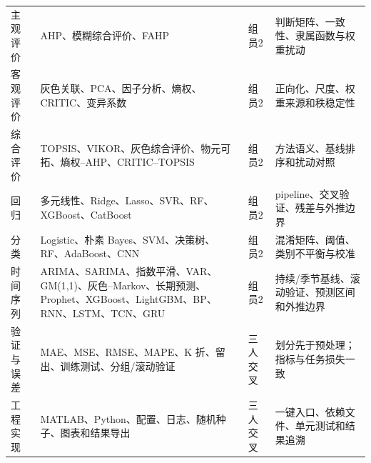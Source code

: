 \begin{longtable}{p{2.1cm}p{5.0cm}p{2.0cm}p{5.5cm}}
主观评价 & AHP、模糊综合评价、FAHP & 组员2 & 判断矩阵、一致性、隶属函数与权重扰动\\
客观评价 & 灰色关联、PCA、因子分析、熵权、CRITIC、变异系数 & 组员2 & 正向化、尺度、权重来源和秩稳定性\\
综合评价 & TOPSIS、VIKOR、灰色综合评价、物元可拓、熵权--AHP、CRITIC--TOPSIS & 组员2 & 方法语义、基线排序和扰动对照\\
回归 & 多元线性、Ridge、Lasso、SVR、RF、XGBoost、CatBoost & 组员2 & pipeline、交叉验证、残差与外推边界\\
分类 & Logistic、朴素 Bayes、SVM、决策树、RF、AdaBoost、CNN & 组员2 & 混淆矩阵、阈值、类别不平衡与校准\\
时间序列 & ARIMA、SARIMA、指数平滑、VAR、GM(1,1)、灰色--Markov、长期预测、Prophet、XGBoost、LightGBM、BP、RNN、LSTM、TCN、GRU & 组员2 & 持续/季节基线、滚动验证、预测区间和外推边界\\
验证与误差 & MAE、MSE、RMSE、MAPE、K 折、留出、训练测试、分组/滚动验证 & 三人交叉 & 划分先于预处理；指标与任务损失一致\\
工程实现 & MATLAB、Python、配置、日志、随机种子、图表和结果导出 & 三人交叉 & 一键入口、依赖文件、单元测试和结果追溯\\
\bottomrule
\end{longtable}

